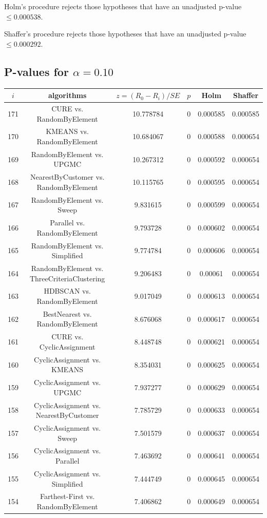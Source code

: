 \documentclass[a4paper,10pt]{article}
\begin{document}
\begin{landscape}
Holm's procedure rejects those hypotheses that have an unadjusted p-value $\le0.000538$.

Shaffer's procedure rejects those hypotheses that have an unadjusted p-value $\le0.000292$.

\pagebreak

\subsection{P-values for $\alpha=0.10$}

\begin{table}[!htp]
\centering\scriptsize
\begin{tabular}{cccccc}
$i$&algorithms&$z=(R_0 - R_i)/SE$&$p$&Holm&Shaffer\\
\hline171&CURE vs. RandomByElement&10.778784&0&0.000585&0.000585\\
170&KMEANS vs. RandomByElement&10.684067&0&0.000588&0.000654\\
169&RandomByElement vs. UPGMC&10.267312&0&0.000592&0.000654\\
168&NearestByCustomer vs. RandomByElement&10.115765&0&0.000595&0.000654\\
167&RandomByElement vs. Sweep&9.831615&0&0.000599&0.000654\\
166&Parallel vs. RandomByElement&9.793728&0&0.000602&0.000654\\
165&RandomByElement vs. Simplified&9.774784&0&0.000606&0.000654\\
164&RandomByElement vs. ThreeCriteriaClustering&9.206483&0&0.00061&0.000654\\
163&HDBSCAN vs. RandomByElement&9.017049&0&0.000613&0.000654\\
162&BestNearest vs. RandomByElement&8.676068&0&0.000617&0.000654\\
161&CURE vs. CyclicAssignment&8.448748&0&0.000621&0.000654\\
160&CyclicAssignment vs. KMEANS&8.354031&0&0.000625&0.000654\\
159&CyclicAssignment vs. UPGMC&7.937277&0&0.000629&0.000654\\
158&CyclicAssignment vs. NearestByCustomer&7.785729&0&0.000633&0.000654\\
157&CyclicAssignment vs. Sweep&7.501579&0&0.000637&0.000654\\
156&CyclicAssignment vs. Parallel&7.463692&0&0.000641&0.000654\\
155&CyclicAssignment vs. Simplified&7.444749&0&0.000645&0.000654\\
154&Farthest-First vs. RandomByElement&7.406862&0&0.000649&0.000654\\

\end{tabular}
\end{table}
\end{landscape}
\end{document}
